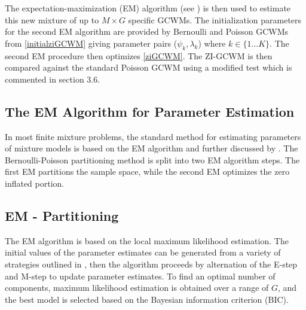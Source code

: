 \documentclass[11pt,letterpaper]{article}
\numberwithin{equation}{section}
\numberwithin{equation}{section}
\numberwithin{equation}{section}
\begin{document}
The expectation-maximization (EM) algorithm (see \cite{Dempster+Laird+Rubin:1977}) is then used to estimate this new mixture of up to $M \times G$ specific GCWMs. The initialization parameters for the second EM algorithm are provided by Bernoulli and Poisson GCWMs from \eqref{initialziGCWM} giving parameter pairs ($ \psi_k,\lambda_k  $) where $k \in \{1 \dots K \} $. The second EM procedure then optimizes \eqref{ziGCWM}. The ZI-GCWM is then compared against the standard Poisson GCWM using a modified test which is commented in section 3.6. 

\subsection{The EM Algorithm for Parameter Estimation}
In most finite mixture problems, the standard method for estimating parameters of mixture models is based on the EM algorithm and further discussed by \cite{McLachlan+Peel:2000}.
The Bernoulli-Poisson partitioning method is split into two EM algorithm steps. The first EM partitions the sample space, while the second EM optimizes the zero inflated portion. 
 \subsection{EM - Partitioning}
 
The EM algorithm is based on the local  maximum likelihood estimation. %
The initial values of the parameter estimates can be generated from a variety of strategies outlined in \cite{initialPaperGrassiaRef}, %
then the algorithm proceeds by alternation of the E-step and M-step to update parameter estimates. %
To find an optimal number of components, maximum likelihood estimation is obtained over a range of $G$, and the best model is selected based on the Bayesian information criterion (BIC).   %
\end{document}
